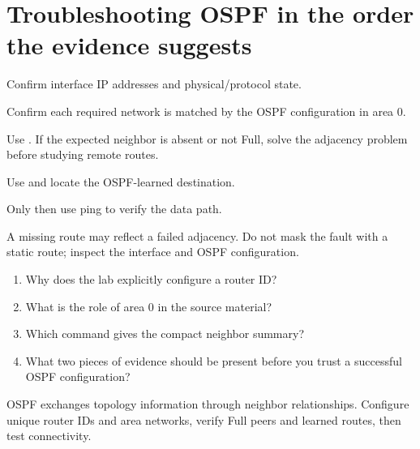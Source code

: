 \section{Troubleshooting OSPF in the order the evidence suggests}
\begin{utpsteps}
\item Confirm interface IP addresses and physical/protocol state.
\item Confirm each required network is matched by the OSPF configuration in area 0.
\item Use . If the expected neighbor is absent or not Full, solve the adjacency problem before studying remote routes.
\item Use  and locate the OSPF-learned destination.
\item Only then use ping to verify the data path.
\end{utpsteps}

\begin{pitfall}
A missing route may reflect a failed adjacency. Do not mask the fault with a static route; inspect the interface and OSPF configuration.
\end{pitfall}

\begin{quickcheck}
\begin{enumerate}
\item Why does the lab explicitly configure a router ID?
\item What is the role of area 0 in the source material?
\item Which command gives the compact neighbor summary?
\item What two pieces of evidence should be present before you trust a successful OSPF configuration?
\end{enumerate}
\end{quickcheck}

\begin{chapterrecap}
OSPF exchanges topology information through neighbor relationships. Configure unique router IDs and area networks, verify Full peers and learned routes, then test connectivity.
\end{chapterrecap}



